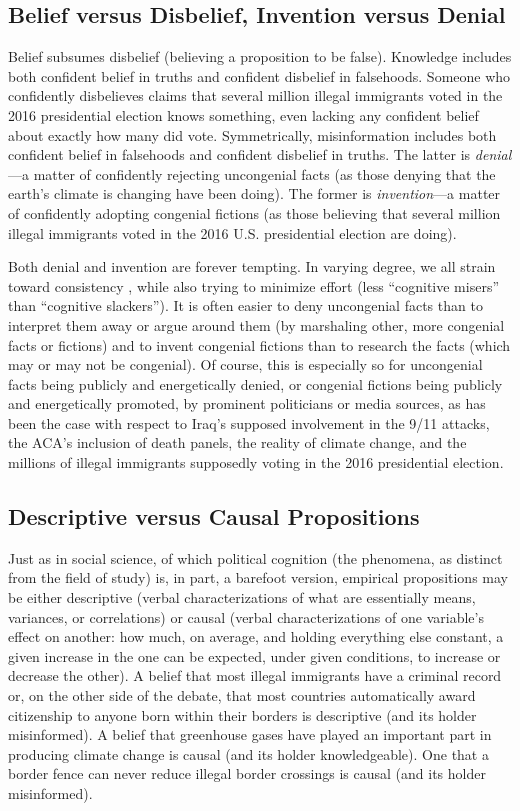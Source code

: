 \documentclass[11pt]{article}
\begin{document}
\subsection{Belief versus Disbelief, Invention versus Denial}

Belief subsumes disbelief (believing a proposition to be false). Knowledge includes both confident belief in truths and confident disbelief in falsehoods. Someone who confidently disbelieves claims that several million illegal immigrants voted in the 2016 presidential election knows something, even lacking any confident belief about exactly how many did vote. Symmetrically, misinformation includes both confident belief in falsehoods and confident disbelief in truths. The latter is \emph{denial}---a matter of confidently rejecting uncongenial facts (as those denying that the earth's climate is changing have been doing). The former is \emph{invention}---a matter of confidently adopting congenial fictions (as those believing that several million illegal immigrants voted in the 2016 U.S. presidential election are doing).

Both denial and invention are forever tempting. In varying degree, we all strain toward consistency \citep{festinger1957, kunda1990}, while also trying to minimize effort (less ``cognitive misers'' than ``cognitive slackers''). It is often easier to deny uncongenial facts than to interpret them away or argue around them (by marshaling other, more congenial facts or fictions) and to invent congenial fictions than to research the facts (which may or may not be congenial). Of course, this is especially so for uncongenial facts being publicly and energetically denied, or congenial fictions being publicly and energetically promoted, by prominent politicians or media sources, as has been the case with respect to Iraq's supposed involvement in the 9/11 attacks, the ACA's inclusion of death panels, the reality of climate change, and the millions of illegal immigrants supposedly voting in the 2016 presidential election.

\subsection{Descriptive versus Causal Propositions}

Just as in social science, of which political cognition (the phenomena, as distinct from the field of study) is, in part, a barefoot version, empirical propositions may be either descriptive (verbal characterizations of what are essentially means, variances, or correlations) or causal (verbal characterizations of one variable's effect on another: how much, on average, and holding everything else constant, a given increase in the one can be expected, under given conditions, to increase or decrease the other). A belief that most illegal immigrants have a criminal record or, on the other side of the debate, that most countries automatically award citizenship to anyone born within their borders is descriptive (and its holder misinformed). A belief that greenhouse gases have played an important part in producing climate change is causal (and its holder knowledgeable). One that a border fence can never reduce illegal border crossings is causal (and its holder misinformed).
\end{document}
